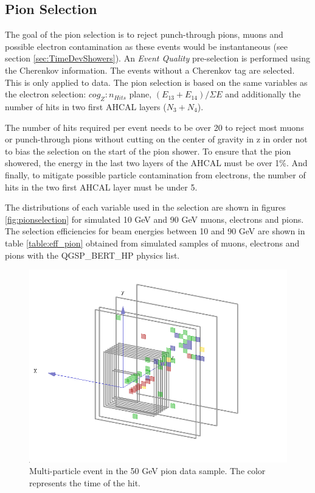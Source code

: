 \subsection{Pion Selection}
\label{sec:pionsel}

The goal of the pion selection is to reject punch-through pions, muons and possible electron contamination as these events would be instantaneous (see section \ref{sec:TimeDevShowers}). An \textit{Event Quality} pre-selection is performed using the Cherenkov information. The events without a Cherenkov tag are selected. This is only applied to data. The pion selection is based on the same variables as the electron selection: $cog_Z:n_{Hits}$ plane, $(E_{13}+E_{14})/\Sigma E$ and additionally the number of hits in two first AHCAL layers ($N_3+N_4$).

The number of hits required per event needs to be over 20 to reject most muons or punch-through pions without cutting on the center of gravity in z in order not to bias the selection on the start of the pion shower. To ensure that the pion showered, the energy in the last two layers of the AHCAL must be over 1\%. And finally, to mitigate possible particle contamination from electrons, the number of hits in the two first AHCAL layer must be under 5.

The distributions of each variable used in the selection are shown in figures \ref{fig:pionselection} for simulated 10 GeV and 90 GeV muons, electrons and pions. The selection efficiencies for beam energies between 10 and 90 GeV are shown in table \ref{table:eff_pion} obtained from simulated samples of muons, electrons and pions with the QGSP\_BERT\_HP physics list.

\begin{figure}[htbp!]
	\centering
	\includegraphics[width=0.7\linewidth]{chap5/fig_AHCAL_timing/Pions/DoubleParticleEventPions.png}
	\caption{Multi-particle event in the 50 GeV pion data sample. The color represents the time of the hit.} \label{fig:DoubleParticleEvent}
\end{figure}

